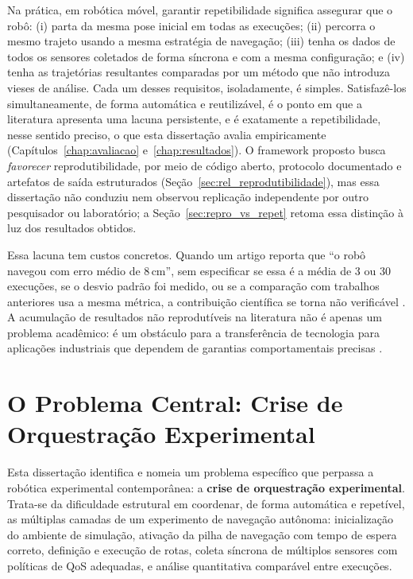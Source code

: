 Na prática, em robótica móvel, garantir repetibilidade significa assegurar que
o robô: (i) parta da mesma pose inicial em todas as execuções; (ii) percorra o
mesmo trajeto usando a mesma estratégia de navegação; (iii) tenha os dados de
todos os sensores coletados de forma síncrona e com a mesma configuração; e
(iv) tenha as trajetórias resultantes comparadas por um método que não
introduza vieses de análise. Cada um desses requisitos, isoladamente, é
simples. Satisfazê-los simultaneamente, de forma automática e reutilizável, é
o ponto em que a literatura apresenta uma lacuna persistente, e é
exatamente a repetibilidade, nesse sentido preciso, o que esta dissertação
avalia empiricamente (Capítulos~\ref{chap:avaliacao} e~\ref{chap:resultados}). O
framework proposto busca \emph{favorecer} reprodutibilidade, por meio de
código aberto, protocolo documentado e artefatos de saída estruturados
(Seção~\ref{sec:rel_reprodutibilidade}), mas essa dissertação não conduziu
nem observou replicação independente por outro pesquisador ou laboratório;
a Seção~\ref{sec:repro_vs_repet} retoma essa distinção à luz dos resultados
obtidos.

Essa lacuna tem custos concretos. Quando um artigo reporta que ``o robô navegou com
erro médio de 8\,cm'', sem especificar se essa é a média de 3 ou 30 execuções, se o
desvio padrão foi medido, ou se a comparação com trabalhos anteriores usa a mesma
métrica, a contribuição científica se torna não verificável \cite{amigoni2014}. A
acumulação de resultados não reprodutíveis na literatura não é apenas um problema
acadêmico: é um obstáculo para a transferência de tecnologia para aplicações
industriais que dependem de garantias comportamentais precisas \cite{bonsignorio2015}.

\section{O Problema Central: Crise de Orquestração Experimental}
\label{sec:problema}

Esta dissertação identifica e nomeia um problema específico que perpassa a robótica
experimental contemporânea: a \textbf{crise de orquestração experimental}. Trata-se
da dificuldade estrutural em coordenar, de forma automática e repetível, as múltiplas
camadas de um experimento de navegação autônoma: inicialização do ambiente de
simulação, ativação da pilha de navegação com tempo de espera correto, definição e
execução de rotas, coleta síncrona de múltiplos sensores com políticas de QoS adequadas,
e análise quantitativa comparável entre execuções.

